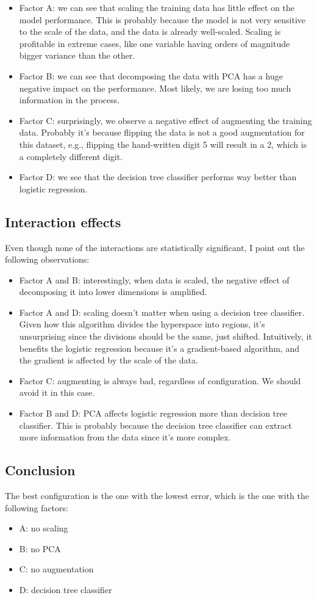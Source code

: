 \documentclass{article}
\begin{document}
\begin{itemize}
    \item Factor A: we can see that scaling the training data has little effect on the model performance. This is probably because the model is not very sensitive to the scale of the data, and the data is already well-scaled. Scaling is profitable in extreme cases, like one variable having orders of magnitude bigger variance than the other.
    \item Factor B: we can see that decomposing the data with PCA has a huge negative impact on the performance. Most likely, we are losing too much information in the process.
    \item Factor C: surprisingly, we observe a negative effect of augmenting the training data. Probably it's because flipping the data is not a good augmentation for this dataset, e.g., flipping the hand-written digit 5 will result in a 2, which is a completely different digit.
    \item Factor D: we see that the decision tree classifier performs way better than logistic regression.
\end{itemize}

\subsection{Interaction effects}

Even though none of the interactions are statistically significant, I point out the following observations:

\begin{itemize}
    \item Factor A and B: interestingly, when data is scaled, the negative effect of decomposing it into lower dimensions is amplified.
    \item Factor A and D: scaling doesn't matter when using a decision tree classifier. Given how this algorithm divides the hyperspace into regions, it's unsurprising since the divisions should be the same, just shifted. Intuitively, it benefits the logistic regression because it's a gradient-based algorithm, and the gradient is affected by the scale of the data.
    \item Factor C: augmenting is always bad, regardless of configuration. We should avoid it in this case.
    \item Factor B and D: PCA affects logistic regression more than decision tree classifier. This is probably because the decision tree classifier can extract more information from the data since it's more complex.
\end{itemize}

\subsection{Conclusion}

The best configuration is the one with the lowest error, which is the one with the following factors:

\begin{itemize}
    \item A: no scaling
    \item B: no PCA
    \item C: no augmentation
    \item D: decision tree classifier
\end{itemize}
\end{document}
